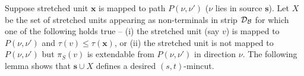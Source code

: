 




Suppose stretched unit $\mathbf x$ is mapped to path $P(\nu,\nu')$ ($\nu$ lies in source $\mathbf{s}$). Let $X$ be the set of stretched units appearing as non-terminals in strip ${\cal D}_{\cal B}$ for which one of the following holds true -- (i) the stretched unit (say $v$) is mapped to $P(\nu,\nu')$ and $\tau(v) \leq \tau(\mathbf x)$, or (ii) the stretched unit is not mapped to $P(\nu,\nu')$ but $\pi_S(v)$ is extendable from $P(\nu,\nu')$ in direction $\nu$. The following lemma shows that $\mathbf{s}\cup X$ defines a desired $(s,t)$-mincut.

